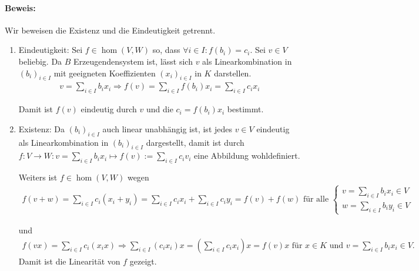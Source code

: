 \paragraph{Beweis:}
	Wir beweisen die Existenz und die Eindeutigkeit getrennt. 
	\begin{enumerate}
		\item Eindeutigkeit: Sei $f\in \hom(V,W)$ so, dass $\forall i\in I: f(b_i)=c_i$. Sei $v\in V$ beliebig. Da $ B $ Erzeugendensystem ist, lässt sich $ v $ als Linearkombination in $(b_i)_{i\in I}$ mit geeigneten Koeffizienten $(x_i)_{i\in I}$ in $ K $ darstellen.
			\begin{gather*}
    				v=\sum_{i\in I}b_ix_i \Rightarrow f(v) = \sum_{i\in I} f(b_i)x_i = \sum_{i\in I}c_ix_i
    			\end{gather*}
    
                        Damit ist $ f(v) $ eindeutig durch $ v $ und die $c_i = f(b_i)x_i$ bestimmt.
    
    		\item Existenz: Da $(b_i)_{i\in I}$ auch linear unabhängig ist, ist jedes $v\in V$ eindeutig als Linearkombination in $(b_i)_{i\in I}$ dargestellt, damit ist durch $f:V\to W: v=\sum_{i\in I}b_ix_i \mapsto f(v):=\sum_{i\in I}c_iv_i$ eine Abbildung wohldefiniert.
    
                        Weiters ist $f\in\hom(V,W)$ wegen
                        \begin{gather*}
                                f(v+w) =\sum_{i\in I}c_i(x_i+y_i)=\sum_{i\in I}c_ix_i+ \sum_{i\in I}c_iy_i =  f(v) + f(w) \text{ für alle }\left\{
                                        \begin{array}{l}
                                                v=\sum_{i\in I}b_ix_i \in V\\
                                                w=\sum_{i\in I}b_iy_i \in V
                                        \end{array}
                                \right.
                        \end{gather*}
    
                        und
                        \begin{gather*}
                            f(vx) =\sum_{i\in I}c_i(x_ix)\Rightarrow\sum_{i\in I}(c_ix_i)x = (\sum_{i\in I}c_ix_i)x= f(v)x \text{ für }  x\in K\text{ und }v= \sum_{i\in I}b_ix_i \in V.
                        \end{gather*}
                        Damit ist die Linearität von $ f $ gezeigt.
        \end{enumerate}
    
